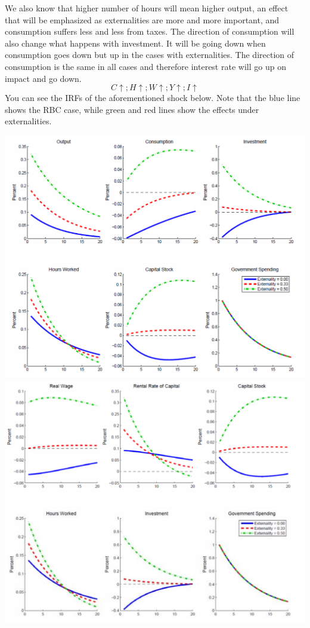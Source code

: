 \documentclass[12pt]{report}
\begin{document}
We also know that higher number of hours will mean higher output, an effect that will be emphasized as externalities are more and more important, and consumption suffers less and less from taxes. The direction of consumption will also change what happens with investment. It will be going down when consumption goes down but up in the cases with externalities. The direction of consumption is the same in all cases and therefore interest rate will go up on impact and go down. $$ C\uparrow ; H\uparrow ; W\uparrow ; Y \uparrow ; I\uparrow $$ You can see the IRFs of the aforementioned shock below. Note that the blue line shows the RBC case, while green and red lines show the effects under externalities. \begin{center}
\includegraphics[scale=0.4]{images/RBC3-gshock1.PNG} 
\includegraphics[scale=0.4]{images/RBC3-gshock2.PNG} 
\end{center}
\end{document}
